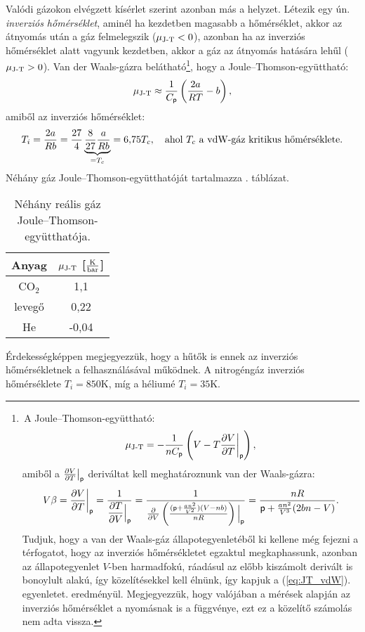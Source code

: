 Valódi gázokon elvégzett kísérlet szerint azonban más a helyzet. Létezik egy ún. \emph{inverziós hőmérséklet}, aminél ha kezdetben magasabb a hőmérséklet, akkor az átnyomás után a gáz felmelegszik ($\mu_{\textnormal{J-T}}<0$), azonban ha az inverziós hőmérséklet alatt vagyunk kezdetben, akkor a gáz az átnyomás hatására lehűl ($\mu_{\textnormal{J-T}}>0$).
Van der Waals-gázra belátható\footnote{\,A Joule--Thomson-együttható:
$$\mu_{\textnormal{J-T}} = -\frac{1}{nC_\mathsf p}\left({V-T\frac{\partial{V}}{\partial{T}}\bigg|_\mathsf p}\right),$$
amiből a $\frac{\partial{V}}{\partial{T}}\big|_\mathsf p$ deriváltat kell meghatároznunk van der Waals-gázra:
$$V\beta = \frac{\partial{V}}{\partial{T}}\bigg|_\mathsf p = \frac{1}{\dfrac{\partial T}{\partial V}\Big|_\mathsf p}=\frac{1}{\frac{\partial{}}{\partial{V}}\left({\frac{(\mathsf p+\frac{an^2}{V^2})(V-nb)}{nR}}\right)\Big|_\mathsf p}=\frac{nR}{\mathsf p + \frac{an^2}{V^3}(2bn-V)}.$$ Tudjuk, hogy a van der Waals-gáz állapotegyenletéből ki kellene még fejezni a térfogatot, hogy az inverziós hőmérsékletet egzaktul megkaphassunk, azonban az állapotegyenlet $V$-ben harmadfokú, ráadásul az előbb kiszámolt derivált is bonoylult alakú, így közelítésekkel kell élnünk, így kapjuk a (\ref{eq:JT_vdW}). egyenletet. eredményül. Megjegyezzük, hogy valójában a mérések alapján az inverziós hőmérséklet a nyomásnak is a függvénye, ezt ez a közelítő számolás nem adta vissza.}, hogy a Joule--Thomson-együttható:
\begin{align}\label{eq:JT_vdW}
    \mu_{\textnormal{J-T}} \approx \frac{1}{C_\mathsf p}\left({\frac{2a}{RT}-b}\right),
\end{align}
amiből az inverziós hőmérséklet:
\begin{align}
    T_i=\frac {2a}{Rb} = \frac{27}{4}\underbrace{\frac{8}{27}\frac{a}{Rb}}_{=T_c} = 6{,}75T_c,\quad\textnormal{ahol $T_c$ a vdW-gáz kritikus hőmérséklete.}
\end{align}
Néhány gáz Joule--Thomson-együtthatóját tartalmazza . táblázat.
\begin{table}[h!]
\centering
\begin{tabular}{|c|c|} \hline
Anyag & $\mu_{\textnormal{J-T}}$ [$\frac{\textnormal{K}}{\textnormal{bar}}$] \\ \hline\hline
CO$_2$ & 1{,}1\\ \hline
levegő & 0{,}22\\ \hline
He & -0{,}04\\ \hline
\end{tabular}
\caption{Néhány reális gáz Joule--Thomson-együtthatója.}
\label{tab:JT_coeff}
\end{table}
Érdekességképpen megjegyezzük, hogy a hűtők is ennek az inverziós hőmérsékletnek a felhasználásával működnek. A nitrogéngáz inverziós hőmérséklete $T_i = 850$K, míg a héliumé $T_i = 35$K.